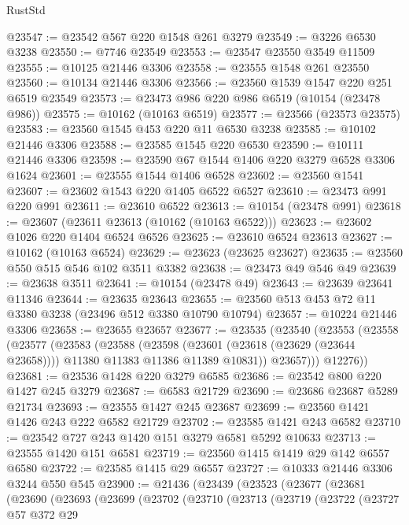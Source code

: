 \begin{lexlean}{RustStd}
\begin{coremodule}
{\begin{coremodule}
{{{{{{{{{{{{{{{{{{{{{{{{{{@23547 := @23542 @567 @220 @1548 @261 @3279
@23549 := @3226 @6530 @3238
@23550 := @7746 @23549
@23553 := @23547 @23550 @3549 @11509
@23555 := @10125 @21446 @3306
@23558 := @23555 @1548 @261 @23550
@23560 := @10134 @21446 @3306
@23566 := @23560 @1539 @1547 @220 @251 @6519 @23549
@23573 := @23473 @986 @220 @986 @6519 (@10154 (@23478 @986))
@23575 := @10162 (@10163 @6519)
@23577 := @23566 (@23573 @23575)
@23583 := @23560 @1545 @453 @220 @11 @6530 @3238
@23585 := @10102 @21446 @3306
@23588 := @23585 @1545 @220 @6530
@23590 := @10111 @21446 @3306
@23598 := @23590 @67 @1544 @1406 @220 @3279 @6528 @3306 @1624
@23601 := @23555 @1544 @1406 @6528
@23602 := @23560 @1541
@23607 := @23602 @1543 @220 @1405 @6522 @6527
@23610 := @23473 @991 @220 @991
@23611 := @23610 @6522
@23613 := @10154 (@23478 @991)
@23618 := @23607 (@23611 @23613 (@10162 (@10163 @6522)))
@23623 := @23602 @1026 @220 @1404 @6524 @6526
@23625 := @23610 @6524 @23613
@23627 := @10162 (@10163 @6524)
@23629 := @23623 (@23625 @23627)
@23635 := @23560 @550 @515 @546 @102 @3511 @3382
@23638 := @23473 @49 @546 @49
@23639 := @23638 @3511
@23641 := @10154 (@23478 @49)
@23643 := @23639 @23641 @11346
@23644 := @23635 @23643
@23655 := @23560 @513 @453 @72 @11 @3380 @3238 (@23496 @512 @3380 @10790 @10794)
@23657 := @10224 @21446 @3306
@23658 := @23655 @23657
@23677 := @23535
    (@23540
      (@23553
        (@23558
          (@23577
            (@23583
              (@23588
                (@23598
                  (@23601 (@23618 (@23629 (@23644 @23658))))
                  @11380
                  @11383
                  @11386
                  @11389
                  @10831))
              @23657)))
        @12276))
@23681 := @23536 @1428 @220 @3279 @6585
@23686 := @23542 @800 @220 @1427 @245 @3279
@23687 := @6583 @21729
@23690 := @23686 @23687 @5289 @21734
@23693 := @23555 @1427 @245 @23687
@23699 := @23560 @1421 @1426 @243 @222 @6582 @21729
@23702 := @23585 @1421 @243 @6582
@23710 := @23542 @727 @243 @1420 @151 @3279 @6581 @5292 @10633
@23713 := @23555 @1420 @151 @6581
@23719 := @23560 @1415 @1419 @29 @142 @6557 @6580
@23722 := @23585 @1415 @29 @6557
@23727 := @10333 @21446 @3306 @3244 @550 @545
@23900 := @21436
    (@23439
      (@23523
        (@23677
          (@23681
            (@23690
              (@23693
                (@23699
                  (@23702
                    (@23710
                      (@23713
                        (@23719
                          (@23722
                            (@23727
                              @57
                              @372
                              @29
}}}}}}}}}}}}}}}}}}}}}}}}}}
\end{coremodule}}
\end{coremodule}
\end{lexlean}
